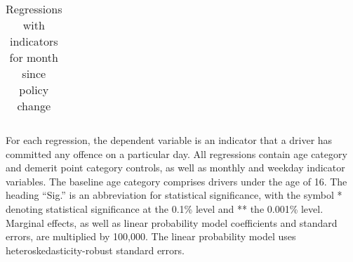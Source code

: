 \begin{table}
\begin{tabular}{l r r r r l r r l}
\hline 

\end{tabular} 
\caption{Regressions with indicators for month since policy change} 
For each regression, the dependent variable is an indicator that a driver has committed  
any offence on a particular day.  
All regressions contain age category and demerit point category controls, 
as well as monthly and weekday indicator variables. 
The baseline age category comprises drivers under the age of 16. 
The heading ``Sig.'' is an abbreviation for statistical significance, with 
the symbol * denoting statistical significance at the 0.1\% level 
and ** the 0.001\% level. 
Marginal effects, as well as linear probability model coefficients and standard errors, are  
multiplied by 100,000.  
The linear probability model uses heteroskedasticity-robust standard errors. 
\label{tab:seas_Logit_vs_LPMx100K_event_month_regs} 
\end{table} 
 
